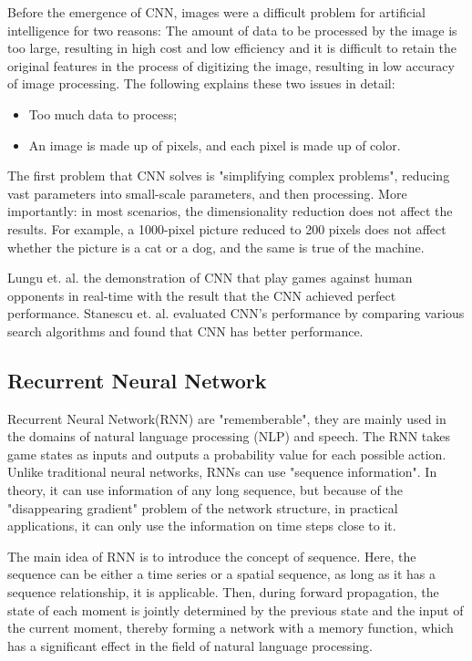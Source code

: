 \documentclass[11pt,en]{elegantpaper}
\begin{document}
Before the emergence of CNN, images were a difficult problem for artificial intelligence for two reasons: The amount of data to be processed by the image is too large, resulting in high cost and low efficiency and it is difficult to retain the original features in the process of digitizing the image, resulting in low accuracy of image processing. The following explains these two issues in detail:
\begin{itemize}
	\item Too much data to process;
	\item An image is made up of pixels, and each pixel is made up of color.
\end{itemize}

The first problem that CNN solves is "simplifying complex problems", reducing vast parameters into small-scale parameters, and then processing. More importantly: in most scenarios, the dimensionality reduction does not affect the results. For example, a 1000-pixel picture reduced to 200 pixels does not affect whether the picture is a cat or a dog, and the same is true of the machine.

Lungu et. al. \cite{cnn1} the demonstration of CNN that play games against human opponents in real-time with the result that the CNN achieved perfect performance. Stanescu et. al. \cite{cnn2} evaluated CNN's performance by comparing various search algorithms and found that CNN has better performance.




\subsection{Recurrent Neural Network}
 Recurrent Neural Network(RNN) are "rememberable", they are mainly used in the domains of natural language processing (NLP) and speech. The RNN takes game states as inputs and outputs a probability value for each possible action. Unlike traditional neural networks, RNNs can use "sequence information". In theory, it can use information of any long sequence, but because of the "disappearing gradient" problem of the network structure, in practical applications, it can only use the information on time steps close to it.

The main idea of RNN is to introduce the concept of sequence. Here, the sequence can be either a time series or a spatial sequence, as long as it has a sequence relationship, it is applicable. Then, during forward propagation, the state of each moment is jointly determined by the previous state and the input of the current moment, thereby forming a network with a memory function, which has a significant effect in the field of natural language processing.
\end{document}
